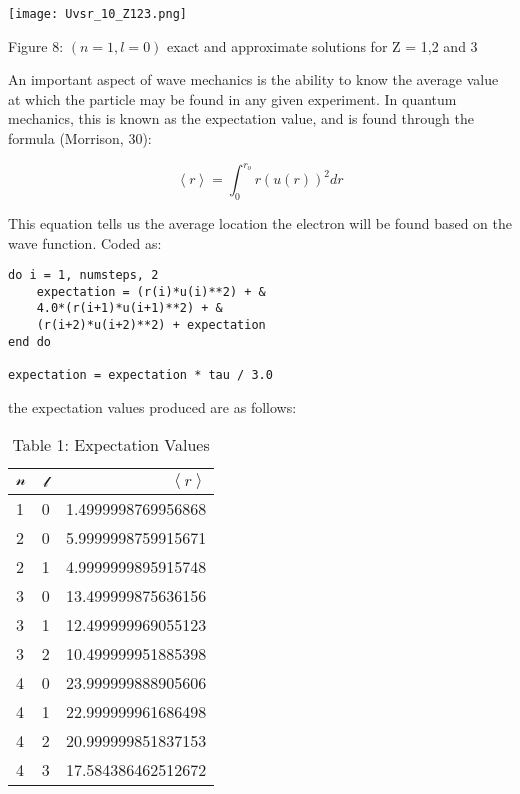 \documentclass{article}
\begin{document}
\vspace{0.1in}

\texttt{[image: Uvsr\_10\_Z123.png]}
\scriptsize{
\begin{center}
Figure 8: $(n=1 , l=0)$ exact and approximate solutions for Z = 1,2 and 3
\end{center}
}

\begin{multicols}{2}
\normalsize{
An important aspect of wave mechanics is the ability to know the average value at which the particle may be found in any given experiment. In quantum mechanics, this is known as the expectation value, and is found through the formula (Morrison, 30):
}

\begin{equation}
\label{equation7}
\left\langle r \right\rangle = \int_{0}^{r_o}r(u(r))^2dr
\end{equation}

This equation tells us the average location the electron will be found based on the wave function. Coded as:

\small{
\begin{verbatim}
do i = 1, numsteps, 2
    expectation = (r(i)*u(i)**2) + &
    4.0*(r(i+1)*u(i+1)**2) + &
    (r(i+2)*u(i+2)**2) + expectation
end do

expectation = expectation * tau / 3.0
\end{verbatim}
}

\normalsize{
the expectation values produced are as follows:
}

\end{multicols}

\begin{table}[h!]
    \caption{Table 1: Expectation Values}
    \vspace{0.05in}
    \label{tab:table1}
    \begin{center}
    \begin{tabular}{l|c|r} 
      $\mathcal{n}$ &  $\mathcal{l}$ & $\left\langle r \right\rangle$ \hspace{0.53in} \\
      \hline
      1 & 0 & 1.4999998769956868\\
      2 & 0 & 5.9999998759915671\\
      2 & 1 & 4.9999999895915748\\
      3 & 0 & 13.499999875636156\\
      3 & 1 & 12.499999969055123\\
      3 & 2 & 10.499999951885398\\
      4 & 0 & 23.999999888905606\\
      4 & 1 & 22.999999961686498\\
      4 & 2 & 20.999999851837153\\
      4 & 3 & 17.584386462512672\\
    \end{tabular}
    \end{center}
\end{table}
\end{document}
